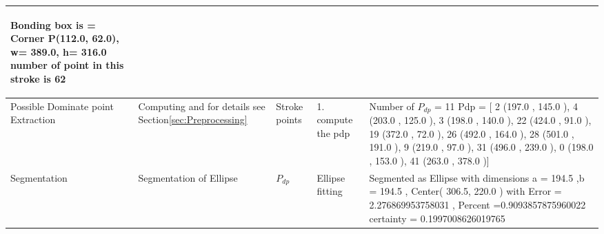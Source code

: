 \begin{landscape}
\begin{scriptsize}
\begin{longtable}{|p{2cm}|p{2cm}|p{2cm}|p{2cm}|p{13cm}|}
\begin{scriptsize}
 Bonding box is  = Corner P(112.0, 62.0), w= 389.0, h=  316.0
 number of point in this stroke is   62
\end{scriptsize}
 \\ \hline
Possible Dominate point Extraction & Computing and for details see Section\ref{sec:Preprocessing} &  Stroke points  & 1. compute   the pdp  &    Number of $P_{dp}$  = 11
 Pdp = [ 2 (197.0 , 145.0 ), 4 (203.0 , 125.0 ), 3 (198.0 , 140.0 ), 22 (424.0 , 91.0 ), 19 (372.0 , 72.0 ), 26 (492.0 , 164.0 ), 28 (501.0 , 191.0 ), 9 (219.0 , 97.0 ), 31 (496.0 , 239.0 ), 0 (198.0 , 153.0 ), 41 (263.0 , 378.0 )]

\\ \hline 
Segmentation & Segmentation of Ellipse & $P_{dp}$   &  Ellipse fitting  & 
 Segmented as Ellipse with dimensions  a = 194.5 ,b = 194.5 , Center( 306.5,  220.0 )   with Error =  2.276869953758031 , Percent =0.9093857875960022
 certainty  =  0.1997008626019765 
\\ \hline
 

\end{longtable}
\end{scriptsize}
\end{landscape}
